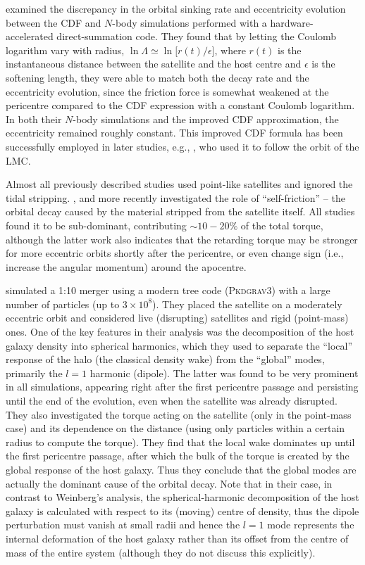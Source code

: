 \documentclass[twocolumn]{aastex63}
\begin{document}
\citet{Hashimoto2003} examined the discrepancy in the orbital sinking rate and eccentricity evolution between the CDF and $N$-body simulations performed with a hardware-accelerated direct-summation code. They found that by letting the Coulomb logarithm vary with radius, $\ln\Lambda \simeq \ln\big[r(t) / \epsilon \big]$, where $r(t)$ is the instantaneous distance between the satellite and the host centre and $\epsilon$ is the softening length, they were able to match both the decay rate and the eccentricity evolution, since the friction force is somewhat weakened at the pericentre compared to the CDF expression with a constant Coulomb logarithm. In both their $N$-body simulations and the improved CDF approximation, the eccentricity remained roughly constant. This improved CDF formula has been successfully employed in later studies, e.g., \citet{Jethwa2016}, who used it to follow the orbit of the LMC.

Almost all previously described studies used point-like satellites and ignored the tidal stripping. \citet{Fujii2006}, \citet{Fellhauer2007} and more recently \citet{Miller2020} investigated the role of ``self-friction'' -- the orbital decay caused by the material stripped from the satellite itself. All studies found it to be sub-dominant, contributing $\sim10-20\%$ of the total torque, although the latter work also indicates that the retarding torque may be stronger for more eccentric orbits shortly after the pericentre, or even change sign (i.e., increase the angular momentum) around the apocentre.

\citet{Tamfal2021} simulated a 1:10 merger using a modern tree code (\textsc{Pkdgrav3}) with a large number of particles (up to $3\times10^8$). They placed the satellite on a moderately eccentric orbit and considered live (disrupting) satellites and rigid (point-mass) ones. One of the key features in their analysis was the decomposition of the host galaxy density into spherical harmonics, which they used to separate the ``local'' response of the halo (the classical density wake) from the ``global'' modes, primarily the $l=1$ harmonic (dipole). The latter was found to be very prominent in all simulations, appearing right after the first pericentre passage and persisting until the end of the evolution, even when the satellite was already disrupted. They also investigated the torque acting on the satellite (only in the point-mass case) and its dependence on the distance (using only particles within a certain radius to compute the torque). They find that the local wake dominates up until the first pericentre passage, after which the bulk of the torque is created by the global response of the host galaxy. Thus they conclude that the global modes are actually the dominant cause of the orbital decay. Note that in their case, in contrast to Weinberg's analysis, the spherical-harmonic decomposition of the host galaxy is calculated with respect to its (moving) centre of density, thus the dipole perturbation must vanish at small radii and hence the $l=1$ mode represents the internal deformation of the host galaxy rather than its offset from the centre of mass of the entire system (although they do not discuss this explicitly).
\end{document}
